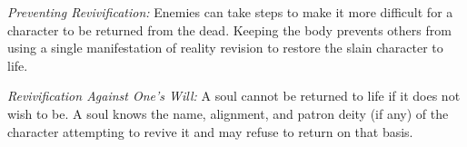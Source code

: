 \textit{Preventing Revivification:} Enemies can take steps to make it more difficult for a character to be returned from the dead. Keeping the body prevents others from using a single manifestation of reality revision to restore the slain character to life.

\textit{Revivification Against One's Will:} A soul cannot be returned to life if it does not wish to be. A soul knows the name, alignment, and patron deity (if any) of the character attempting to revive it and may refuse to return on that basis.